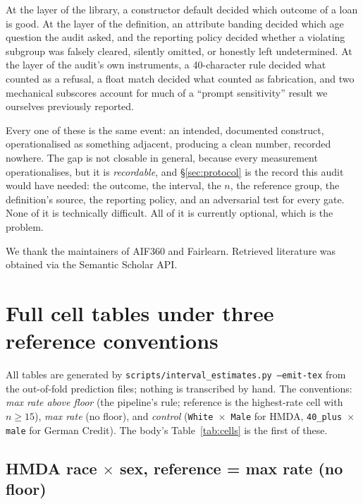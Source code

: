\documentclass[sigconf,nonacm]{acmart}
\begin{document}
At the layer of the library, a constructor default decided which outcome of
a loan is good. At the layer of the definition, an attribute banding decided
which age question the audit asked, and the reporting policy decided whether
a violating subgroup was falsely cleared, silently omitted, or honestly left
undetermined. At the layer of the audit's own instruments, a 40-character
rule decided what counted as a refusal, a float match decided what counted
as fabrication, and two mechanical subscores account for much of a ``prompt
sensitivity'' result we ourselves previously reported.

Every one of these is the same event: an intended, documented construct,
operationalised as something adjacent, producing a clean number, recorded
nowhere. The gap is not closable in general, because every measurement
operationalises, but it is \emph{recordable}, and \S\ref{sec:protocol} is
the record this audit would have needed: the outcome, the interval, the $n$,
the reference group, the definition's source, the reporting policy, and an
adversarial test for every gate. None of it is technically difficult. All of
it is currently optional, which is the problem.

\begin{acks}
We thank the maintainers of AIF360 and Fairlearn. Retrieved literature was
obtained via the Semantic Scholar API.
\end{acks}




\appendix

\section{Full cell tables under three reference conventions}
\label{app:cells}

All tables are generated by \texttt{scripts/interval\_estimates.py --emit-tex}
from the out-of-fold prediction files; nothing is transcribed by hand. The
conventions: \emph{max rate above floor} (the pipeline's rule; reference is
the highest-rate cell with $n \geq 15$), \emph{max rate} (no floor), and
\emph{control} (\texttt{White $\times$ Male} for HMDA, \texttt{40\_plus
$\times$ male} for German Credit). The body's Table~\ref{tab:cells} is the
first of these.

\subsection*{HMDA race $\times$ sex, reference = max rate (no floor)}
{\small}
\end{document}
